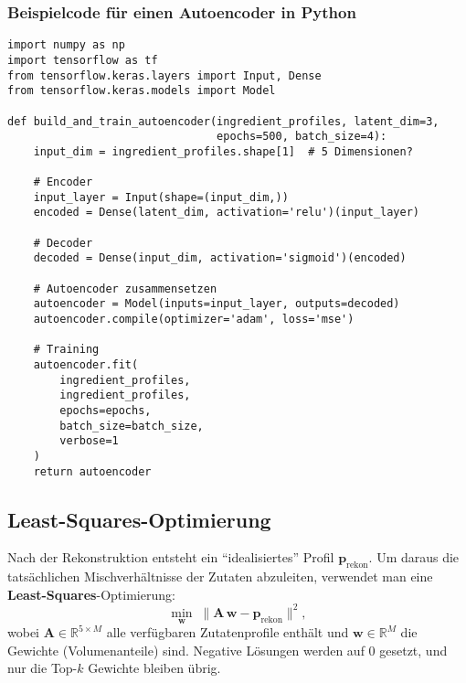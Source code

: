 \documentclass[12pt,a4paper]{report}
\begin{document}
\subsubsection*{Beispielcode für einen Autoencoder in Python}
\begin{lstlisting}[style=custompython, caption={Einfacher Autoencoder-Aufbau mit Keras}]
import numpy as np
import tensorflow as tf
from tensorflow.keras.layers import Input, Dense
from tensorflow.keras.models import Model

def build_and_train_autoencoder(ingredient_profiles, latent_dim=3, 
                                epochs=500, batch_size=4):
    input_dim = ingredient_profiles.shape[1]  # 5 Dimensionen?
    
    # Encoder
    input_layer = Input(shape=(input_dim,))
    encoded = Dense(latent_dim, activation='relu')(input_layer)
    
    # Decoder
    decoded = Dense(input_dim, activation='sigmoid')(encoded)
    
    # Autoencoder zusammensetzen
    autoencoder = Model(inputs=input_layer, outputs=decoded)
    autoencoder.compile(optimizer='adam', loss='mse')
    
    # Training
    autoencoder.fit(
        ingredient_profiles,
        ingredient_profiles,
        epochs=epochs,
        batch_size=batch_size,
        verbose=1
    )
    return autoencoder
\end{lstlisting}

\subsection{Least-Squares-Optimierung}
Nach der Rekonstruktion entsteht ein \enquote{idealisiertes} Profil \(\mathbf{p}_{\text{rekon}}\). Um daraus die tatsächlichen Mischverhältnisse der Zutaten abzuleiten, verwendet man eine \textbf{Least-Squares}-Optimierung:
\[
\min_{\mathbf{w}} \;\|\mathbf{A}\,\mathbf{w} - \mathbf{p}_{\text{rekon}}\|^2,
\]
wobei \(\mathbf{A} \in \mathbb{R}^{5 \times M}\) alle verfügbaren Zutatenprofile enthält und \(\mathbf{w}\in \mathbb{R}^M\) die Gewichte (Volumenanteile) sind. Negative Lösungen werden auf 0 gesetzt, und nur die Top-\(k\) Gewichte bleiben übrig.
\end{document}
